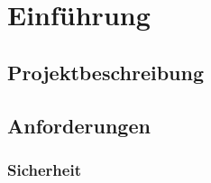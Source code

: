 \documentclass[Bachelorarbeit.tex]{subfiles}
\begin{document}
\chapter{Einführung}
\label{chap:einfuehrung}



\section{Projektbeschreibung}
\label{sec:projektbeschreibung}

 

\section{Anforderungen}
\label{sec:anforderungen}





\subsection*{Sicherheit}
\label{subsec:sicherheit}
\end{document}
